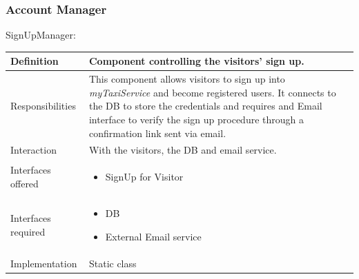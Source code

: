 \documentclass[a4paper,11pt]{report} %
\newcommand{\mts}{\mbox{\normalfont\itshape myTaxiService}}
\begin{document}
	\subsubsection{Account Manager}
	\begin{minipage}{\linewidth}
	\end{minipage} \linebreak
	\centerline{SignUpManager:}	
	\begin{center}
		\begin{tabular}{| l | p{9cm} |}\hline
			Definition & Component controlling the visitors' sign up.\\\hline
			Responsibilities & This component allows visitors to sign up into \mts{} and become registered users. It connects to the DB to store the credentials and requires and Email interface to verify the sign up procedure through a confirmation link sent via email.\\\hline
			Interaction & With the visitors, the DB and email service.\\\hline
			Interfaces offered & \begin{itemize}
				\item SignUp for Visitor
			\end{itemize}\\\hline
			Interfaces required & \begin{itemize}
				\item DB 
				\item External Email service
			\end{itemize}\\\hline
			Implementation & Static class\\\hline
		\end{tabular}
	\end{center}
	
\end{document}
